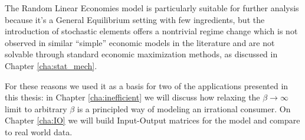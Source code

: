 The Random Linear Economies model is particularly suitable for further
analysis because it's a General Equilibrium setting with few
ingredients, but the introduction of stochastic elements offers a
nontrivial regime change which is not observed in similar
``simple'' economic models in the literature and are not solvable through standard economic maximization methods, as discussed in Chapter \ref{cha:stat_mech}.

For these reasons we used it as a basis for two of the applications presented in this thesis: in Chapter \ref{cha:inefficient} we will discuss how relaxing the $\beta \to \infty$ limit to arbitrary $\beta$ is a principled way of modeling an irrational consumer. On Chapter \ref{cha:IO} we will build Input-Output matrices for the model and compare to real world data.